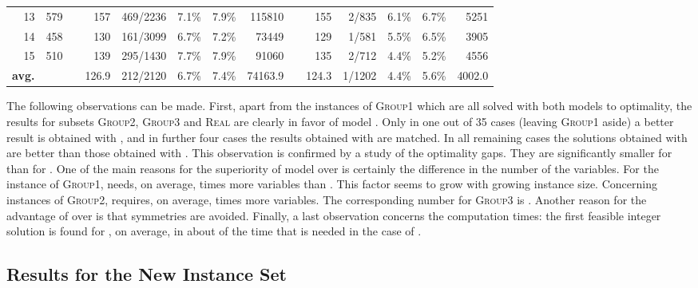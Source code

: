 \documentclass[11pt,a4paper]{article}
\newcommand{\ccg}{\cellcolor{lightgray}}
\begin{document}
\begin{table}[t!]
{\begin{tabular}{rrrrrrrrrrrrrr}
13         & 579 &&     157    &	   469/2236 & 7.1\% & 7.9\%  & 115810    &&      \ccg155 &    2/835   & 6.1\%   & 6.7\% & 5251 \\
14         & 458 &&     130    &	   161/3099 & 6.7\% & 7.2\%  & 73449     &&      \ccg129 &    1/581   & 5.5\%   & 6.5\% & 3905  \\
15         & 510 &&     139    &	   295/1430 & 7.7\% & 7.9\%  & 91060     &&      \ccg135 &    2/712   & 4.4\%   & 5.2\% & 4556  \\ \hline
{\bf avg.} & &&     126.9  &         212/2120 & 6.7\% & 7.4\%  & 74163.9   &&    \ccg124.3 &    1/1202  & 4.4\%   & 5.6\% &  4002.0 \\
\hline\hline
\end{tabular}}
\end{table}


The following observations can be made. First, apart from the instances
of \textsc{Group1} which are all solved with both models to optimality, the
results for subsets \textsc{Group2}, \textsc{Group3} and \textsc{Real}
are clearly in favor of model . Only in one out of 35 cases
(leaving \textsc{Group1} aside) a better result is obtained with
, and in further four cases the results obtained with
 are matched. In all remaining cases the solutions obtained
with  are better than those obtained with . This
observation is confirmed by a study of the optimality gaps. They are
significantly smaller for  than for . One of the main reasons for the superiority of model  over  is certainly the difference in the number of the variables. For the instance of \textsc{Group1},  needs, on average,  times more variables than . This factor seems to grow with growing instance size. Concerning instances of \textsc{Group2},  requires, on average,  times more variables. The corresponding number for \textsc{Group3} is . Another reason for the advantage of  over  is that symmetries are avoided. Finally, a
last observation concerns the computation times: the first feasible
integer solution is found for , on average, in about  of
the time that is needed in the case of . 

\subsection{Results for the New Instance Set}
\end{document}
